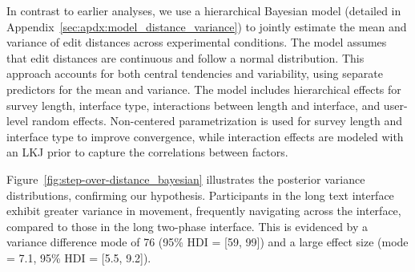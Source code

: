 In contrast to earlier analyses, we use a hierarchical Bayesian model (detailed in Appendix~\ref{sec:apdx:model_distance_variance}) to jointly estimate the mean and variance of edit distances across experimental conditions. The model assumes that edit distances are continuous and follow a normal distribution. This approach accounts for both central tendencies and variability, using separate predictors for the mean and variance. The model includes hierarchical effects for survey length, interface type, interactions between length and interface, and user-level random effects. Non-centered parametrization is used for survey length and interface type to improve convergence, while interaction effects are modeled with an LKJ prior to capture the correlations between factors. %

Figure~\ref{fig:step-over-distance_bayesian} illustrates the posterior variance distributions, confirming our hypothesis. Participants in the long text interface exhibit greater variance in movement, frequently navigating across the interface, compared to those in the long two-phase interface. This is evidenced by a variance difference mode of 76 (95\% HDI = [59, 99]) and a large effect size (mode = 7.1, 95\% HDI = [5.5, 9.2]).

